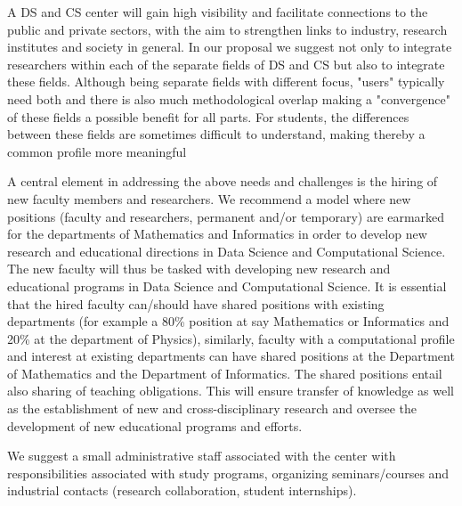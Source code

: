 \documentclass[a4paper,10pt]{article}
\begin{document}
A DS and CS center will gain high visibility and facilitate connections to the public and private sectors, with the aim to strengthen links to  industry, research institutes and society in general.   
In our proposal we suggest not only to integrate researchers within each of the separate fields of DS and CS but also to integrate these fields. Although being separate fields with different focus, "users" typically need both and there is also much methodological overlap making a "convergence" of these fields a possible benefit for all parts. For students, the differences between these fields are sometimes difficult to understand,  making thereby a common profile more meaningful 
\

A central element in addressing the above needs and challenges is the hiring of new faculty members and researchers. We recommend a model where new positions (faculty and researchers, permanent and/or temporary) are earmarked for the departments of Mathematics and Informatics in order to develop new research and educational directions in Data Science and Computational Science.
The new faculty will thus be tasked with developing new research and educational programs in Data Science and Computational Science. It is essential that the hired faculty can/should have shared positions with existing departments (for example a 80\% position at say Mathematics or Informatics and 20\% at the department of Physics), similarly, faculty with a computational profile and interest at existing departments can have shared positions at the Department of Mathematics and the Department of Informatics. The shared positions entail also sharing of teaching obligations.
This will ensure transfer of knowledge as well as the establishment of new and cross-disciplinary research and oversee the development of new educational programs and efforts.

We suggest a small administrative staff associated with the center with responsibilities associated with study programs, organizing seminars/courses and industrial contacts (research collaboration, student internships). 
\end{document}
